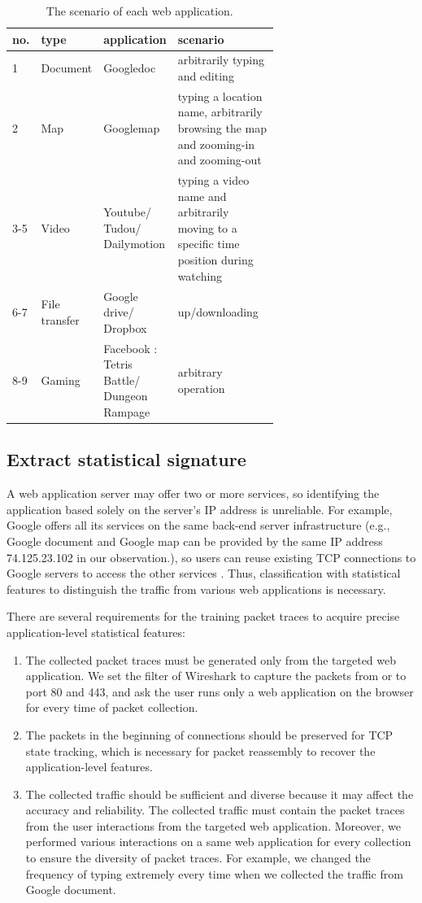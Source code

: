 \begin{table}[ht]
\centering
\caption{The scenario of each web application.}
\begin{tabular}{|l|l|p{0.2\linewidth}|p{0.45\linewidth}|}
\hline no. &type &application &scenario \\
\hline
\hline 1 &Document &Googledoc & arbitrarily typing and editing\\
\hline 2 &Map  &Googlemap & typing a location name, arbitrarily browsing the map and zooming-in and zooming-out\\
\hline 3-5 &Video  & Youtube/ Tudou/ Dailymotion & typing a video name and arbitrarily moving to a specific time position during watching\\
\hline 6-7 &File transfer & Google drive/ Dropbox & up/downloading \\
\hline 8-9 &Gaming &Facebook : Tetris Battle/ Dungeon Rampage & arbitrary operation\\
\hline 
\end{tabular}
\label{table:scenario_app}
\end{table}


\subsection{Extract statistical signature}
A web application server may offer two or more services, so identifying the application based solely on the server's IP address is unreliable. For example, Google offers all its services on the same back-end server infrastructure (e.g., Google document and Google map can be provided by the same IP address 74.125.23.102 in our observation.), so users can reuse existing TCP connections to Google servers to access the other services \cite{TNW08}. Thus, classification with statistical features to distinguish the traffic from various web applications is necessary. 

There are several requirements for the training packet traces to acquire precise application-level statistical features:
\begin{enumerate}
\item 
The collected packet traces must be generated only from the targeted web application. We set the filter of Wireshark to capture the packets from or to port 80 and 443, and ask the user runs only a web application on the browser for every time of packet collection.
\item
The packets in the beginning of connections should be preserved for TCP state tracking, which is necessary for packet reassembly to recover the application-level features.
\item
The collected traffic should be sufficient and diverse because it may affect the accuracy and reliability. The collected traffic must contain the packet traces from the user interactions from the targeted web application. Moreover, we performed various interactions on a same web application for every collection to ensure the diversity of packet traces. For example, we changed the frequency of typing extremely every time when we collected the traffic from Google document.
\end{enumerate}

